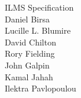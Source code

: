 \begin{titlepage}
\begin{center}
    \vspace*{\fill}
    {\Huge ILMS Specification}\\
    \vspace*{\fill}
    {\large Daniel Birsa}\\\medskip
    {\large Lucille L. Blumire}\\\medskip
    {\large David Chilton}\\\medskip
    {\large Rory Fielding}\\\medskip
    {\large John Galpin}\\\medskip
    {\large Kamal Jahah}\\\medskip
    {\large Ilektra Pavlopoulou}
    \vspace*{\fill}
\end{center}
\end{titlepage}